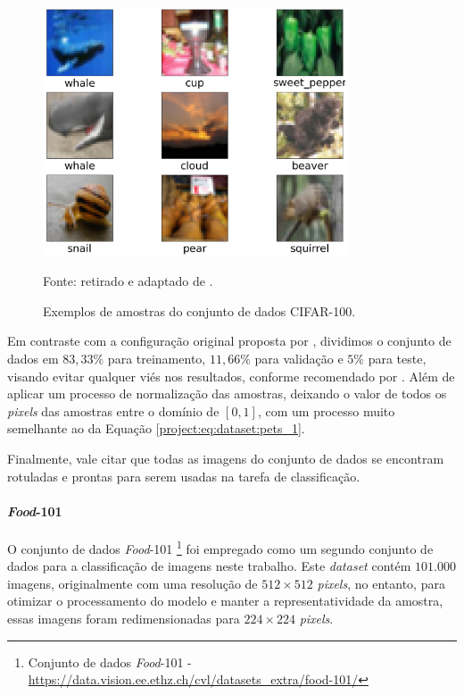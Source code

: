 \begin{figure}[H]
    \centering
    \caption[Amostras do CIFAR-100.]{Exemplos de amostras do conjunto de dados CIFAR-100.}
    \includegraphics[width=0.8\textwidth]{recursos/imagens/project/cifar100v2.png}
    \label{project:fig:dataset:cifar}

    Fonte: retirado e adaptado de \cite{Krizhevsky2014TheDataset}.
\end{figure}


Em contraste com a configuração original proposta por \cite{Krizhevsky2014TheDataset}, dividimos o conjunto de dados em $83,33\%$ para treinamento, $11,66\%$ para validação e $5\%$ para teste, visando evitar qualquer viés nos resultados, conforme recomendado por \cite{Domingos2012ALearning}. Além de aplicar um processo de normalização das amostras, deixando o valor de todos os \textit{pixels} das amostras entre o domínio de $[0, 1]$, com um processo muito semelhante ao da Equação \ref{project:eq:dataset:pets_1}.

Finalmente, vale citar que todas as imagens do conjunto de dados se encontram rotuladas e prontas para serem usadas na tarefa de classificação.

\paragraph{\textit{Food}-101}
\label{project:dataset:food101}
O conjunto de dados \textit{Food}-101 \footnote{Conjunto de dados \textit{Food}-101 - \url{https://data.vision.ee.ethz.ch/cvl/datasets_extra/food-101/}} \citep{Bossard2014Food-101Forests} foi empregado como um segundo conjunto de dados para a classificação de imagens neste trabalho. Este \textit{dataset} contém $101.000$ imagens, originalmente com uma resolução de $512 \times 512$ \textit{pixels}, no entanto, para otimizar o processamento do modelo e manter a representatividade da amostra, essas imagens foram redimensionadas para $224 \times 224$ \textit{pixels}.


